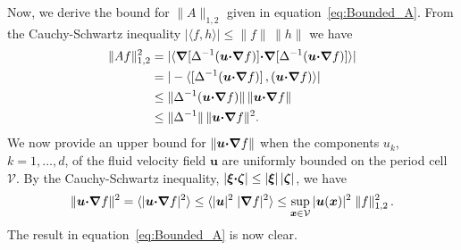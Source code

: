 \documentclass[english,12pt,jmp,graphicx]{revtex4-1}
\newcommand{\vecu}{\boldsymbol{u}}
\newcommand{\vecx}{\boldsymbol{x}}
\newcommand{\vecxi}{\boldsymbol{\xi}}
\newcommand{\veczeta}{\boldsymbol{\zeta}}
\newcommand{\bnabla}{\mbox{\boldmath${\nabla}$}}
\newcommand{\bcdot}{\mbox{\boldmath${\cdot}$}}
\newcommand{\Vc}{\mathcal{V}}
\begin{document}
Now, we derive the bound for $\|A\|_{1,2}$ given in
equation~\eqref{eq:Bounded_A}. From the Cauchy-Schwartz inequality
$|\langle f,h\rangle|\leq\|f\|\,\|h\|$ we have 
%
\begin{align}\label{eq:First_Bound_A}
  \|Af\|_{1,2}^2&=|\langle\bnabla[\Delta^{-1}(\vecu\bcdot\bnabla f)]\bcdot
         \bnabla[\Delta^{-1}(\vecu\bcdot\bnabla f)]\rangle|
         \\  
        &=|-\langle[\Delta^{-1}(\vecu\bcdot\bnabla f)]\,,(\vecu\bcdot\bnabla f)\rangle|
        \notag \\
        &\leq\|\Delta^{-1}(\vecu\bcdot\bnabla f)\|\, \|\vecu\bcdot\bnabla f\|
       \notag \\
       &\leq\|\Delta^{-1}\|\, \|\vecu\bcdot\bnabla f\|^2.   
       \notag
\end{align}
%
We now provide an upper bound for  $\|\vecu\bcdot\bnabla f\|$ when the
components $u_k$, $k=1,\ldots,d$, of the fluid velocity field $\vecu$ are
uniformly bounded on the period cell $\Vc$. By the Cauchy-Schwartz
inequality, $|\vecxi\bcdot\veczeta|\leq|\vecxi|\,|\veczeta|$, we have
%
\begin{align}\label{eq:Second_Bound_A}
  \|\vecu\bcdot\bnabla f\|^2
  =\langle|\vecu\bcdot\bnabla f|^2\rangle
  \leq\langle|\vecu|^2\;|\bnabla f|^2\rangle
  \leq\sup_{\vecx\in\Vc}|\vecu(\vecx)|^2\;\|f\|_{1,2}^2\,.      
\end{align}
%
The result in equation~\eqref{eq:Bounded_A} is now clear. 
\end{document}

